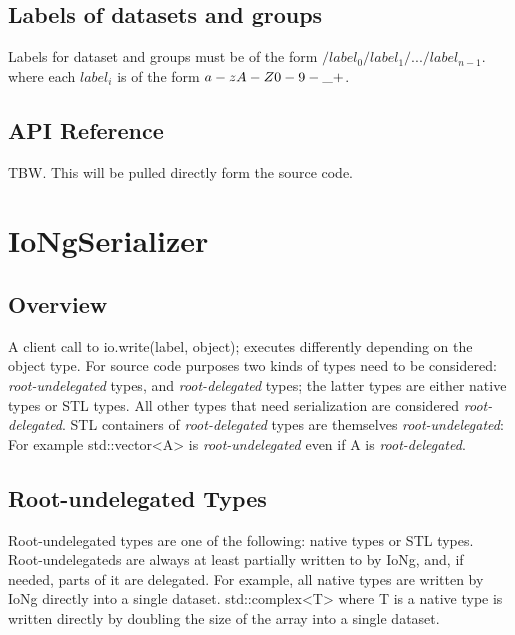 \documentclass{article}
\newcommand{\code}[1]{{\ttfamily #1}}
\begin{document}
\subsection{Labels of datasets and groups}
Labels for dataset and groups must be of the form $/label_0/label_1/.../label_{n-1}$.
where each $label_i$ is of the form $a-zA-Z0-9\\-\_+$.

\subsection{API Reference}
TBW. This will be pulled directly form the source code.

\section{IoNgSerializer}
\subsection{Overview}
A client call to \code{io.write(label, object);} executes differently depending on the
object type. For source code purposes two kinds of types need to be considered:
\emph{root-undelegated} types, and \emph{root-delegated} types; the latter 
types are either native types or STL types. All other types that need
serialization are considered \emph{root-delegated}. STL containers of \emph{root-delegated} types
are themselves \emph{root-undelegated}: For example \code{std::vector<A>} is
\emph{root-undelegated} even if \code{A} is \emph{root-delegated}.

\subsection{Root-undelegated Types}
Root-undelegated types are one of the following: native types or STL types.
Root-undelegateds are always at least partially written to by \code{IoNg},
and, if needed, parts of it are delegated.
For example, all native types are written by \code{IoNg} directly into a single dataset. 
\code{std::complex<T>} where \code{T}
is a native type is written directly by doubling the size of the array into a single dataset.
\end{document}

